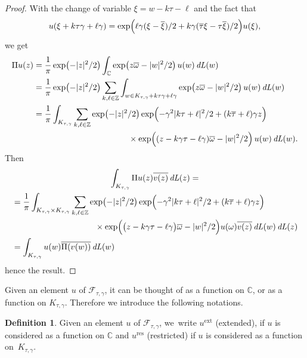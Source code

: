 \documentclass[10pt]{amsart}
\newcommand{\ext}{\mathrm{ext}}
\newcommand{\res}{\mathrm{res}}
\DeclareMathOperator{\dL}{\mathit{dL}}
\theoremstyle{definition}
\newtheorem{df}[theorem]{Definition}
\let\om\omega
\let\EE\exp
\let\ov\overline
\newcommand\C{\mathbb C}
\newcommand\Z{\mathbb Z}
\begin{document}
\begin{proof} With the change of variable $\xi=w-k\tau-\ell$ and the fact that\vspace*{-3pt}
\[
u(\xi+k\tau \gamma+\ell \gamma)=\EE\Bigl({\ell \gamma(\xi-\ov\xi)/2+k\gamma(\ov{\tau}\xi-\tau\ov\xi)/2}\Bigr)u(\xi),
\]
we get\vspace*{-3pt}
\begin{align*}
\Pi u(z)&=\frac1{\pi}\EE\bigl({-|z|^{2}/2}\bigr)\int_{\C}\EE\bigl(z\ov{\om}-|w|^{2}/2\bigr)\,u(w) \dL(w)\\
&=\frac1{\pi}\EE\bigl({-|z|^{2}/2}\bigr)\sum_{k,\ell\in \Z}\int_{w\in K_{\tau,\gamma}+k\tau \gamma+\ell \gamma}\EE\bigl(z\ov{\om}-|w|^{2}/2\bigr)\,u(w) \dL(w)\\
&=\frac1{\pi}\int_{ K_{\tau,\gamma}}\sum_{k,\ell\in \Z}\EE\bigl({-|z|^{2}/2}\bigr) \EE\Bigl({-{\gamma^2}|k\tau+\ell|^{2}/2+(k\ov\tau+\ell)\gamma z}\Bigr)\\
&\hspace{4cm}\times \EE\Bigl({(z-k\gamma \tau-\ell\gamma)\ov{\om}-|w|^{2}/2}\Bigr)\,u(w) \dL(w).
\end{align*}
Then\vspace*{-3pt}
\begin{multline*}
\int_{K_{\tau,\gamma}} \Pi u(z) \ov{v(z)}\dL(z)=\\
\begin{aligned}
&=\frac1{\pi}\int_{ K_{\tau,\gamma}\times K_{\tau,\gamma}}\sum_{k,\ell\in \Z}\EE\bigl({-|z|^{2}/2}\bigr) \EE\Bigl({-{\gamma^2}|k\tau+\ell|^{2}/2+(k\ov\tau+\ell)\gamma z}\Bigr)\\
&\hspace{3.5cm}\times \EE\Bigl({\bigl(z-k\gamma \tau-\ell\gamma\bigr)\ov{\om}-|w|^{2}/2}\Bigr)u(\om)\ov{v(z)}\dL(w) \dL(z)\\
&=\int_{K_{\tau,\gamma}} u(w) \ov{\Pi(v(w))}\dL(w)
\end{aligned}
\end{multline*}
hence the result.
\end{proof}

Given an element $u$ of $\mathcal{F}_{\tau,\gamma}$, it can be thought of as a function on $\mathbb{C}$, or as a function on $K_{\tau,\gamma}$. Therefore we introduce the following notations.

\begin{df}
Given an element $u$ of $\mathcal{F}_{\tau,\gamma}$, we~write $u^{\ext}$ (extended), if $u$ is considered as a function on $\mathbb{C}$ and $u^{\res}$ (restricted) if $u$ is considered as a function on~$K_{\tau,\gamma}$.
\end{df}
\end{document}
